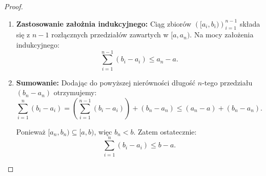 \begin{proof}
\begin{enumerate}[label=\arabic*.]
\begin{enumerate}[label=\theenumi\arabic*., ref=\theenumi.\arabic*]
					Dla każdego $i<n$ zachodzi
					\[
					[a_{i}, b_{i}) \subseteq [a, a_{n})
					.\] 
				\item \textbf{Zastosowanie założnia indukcyjnego:} Ciąg zbiorów $\left( [a_{i}, b_{i}) \right)_{i=1}^{n-1}$ składa się z $n-1$ rozłącznych przedziałów zawartych w  $[a, a_{n})$. Na mocy założenia indukcyjnego:
					\[
					\sum_{i=1}^{n-1} \left( b_{i}-a_{i} \right) \le a_{n}-a
					.\] 
				\item \textbf{Sumowanie:} Dodając do powyższej nierówności  długość $n$-tego przedziału $(b_{n}-a_{n})$ otrzymujemy:
					\[
						\sum_{i=1}^{n} \left( b_{i}-a_{i} \right) = \left(\sum_{i=1}^{n-1} \left( b_{i}-a_{i} \right) \right) + \left( b_{n}-a_{n} \right) \le \left( a_{n} -a \right) + \left( b_{n}-a_{n} \right)
					.\] 

					Ponieważ $[a_{n}, b_{n}) \subseteq [a, b)$, więc $b_{n}<b$. Zatem ostatecznie:
					\[
					\sum_{i=1}^{n} \left( b_{i}-a_{i} \right) \le  b-a
					.\] 
			\end{enumerate}
	\end{enumerate}
\end{proof} 
